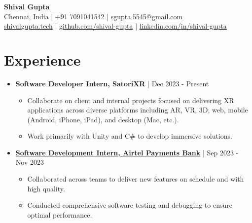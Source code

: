 \documentclass[a4paper,10pt]{article}
\newcommand{\subsectionbreak}{\vspace{0em}} %
\begin{document}
\begin{center}
    \centering
    {\fontsize{24pt}{28pt}\selectfont \textbf{Shival Gupta}} \\
    \vspace{0.2cm}
    \small Chennai, India | +91 7091041542 | \href{mailto:sgupta.5545@gmail.com}{\textcolor{accentcolor}{sgupta.5545@gmail.com}} \\
    \href{https://shivalgupta.tech/}{\textcolor{accentcolor}{shivalgupta.tech}} | \href{https://github.com/shival-gupta/}{\textcolor{accentcolor}{github.com/shival-gupta}} | \href{https://linkedin.com/in/shival-gupta/}{\textcolor{accentcolor}{linkedin.com/in/shival-gupta}}
\end{center}

\vspace{-0.3cm}

\section{Experience}
\begin{itemize}[noitemsep, topsep=0pt]
    \item \textbf{Software Developer Intern, SatoriXR} | Dec 2023 - Present
        \subsectionbreak
        \begin{itemize}
            \item Collaborate on client and internal projects focused on delivering XR applications across diverse platforms including AR, VR, 3D, web, mobile (Android, iPhone, iPad), and desktop (Mac, etc.).
            \item Work primarily with Unity and C\# to develop immersive solutions.
        \end{itemize}
        \subsectionbreak
    \item \href{https://drive.google.com/file/d/1zCj8CKZbHcKEj6LS8N3VzG33aIENUIZA/view?usp=sharing}{\textcolor{accentcolor}{\textbf{Software Development Intern, Airtel Payments Bank}}} | Sep 2023 - Nov 2023
        \subsectionbreak
        \begin{itemize}
            \item Collaborated across teams to deliver new features on schedule and with high quality.
            \item Conducted comprehensive software testing and debugging to ensure optimal performance.
        \end{itemize}
        \subsectionbreak
\end{itemize}
\end{document}
